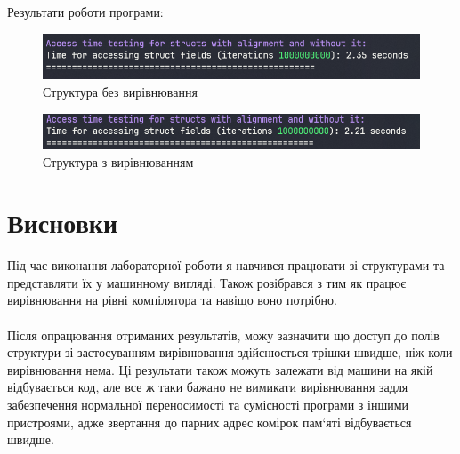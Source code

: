 Результати роботи програми:

\begin{figure}[h!]
    \centering
    \includegraphics[width=14cm]{reports/algos/lab4/assets/8.png}
    \caption{Структура без вирівнювання}
\end{figure}

\begin{figure}[h!]
    \centering
    \includegraphics[width=14cm]{reports/algos/lab4/assets/9.png}
    \caption{Структура з вирівнюванням}
\end{figure}


\clearpage
\section{Висновки}
Під час виконання лабораторної роботи я навчився працювати зі структурами та представляти їх у машинному вигляді. Також розібрався з тим як працює вирівнювання на рівні компілятора та навіщо воно потрібно.
\\ 
\\
Після опрацювання отриманих результатів, можу зазначити що доступ до полів структури зі застосуванням вирівнювання здійснюється трішки швидше, ніж коли вирівнювання нема. Ці результати також можуть залежати від машини на якій відбувається код, але все ж таки бажано не вимикати вирівнювання задля забезпечення нормальної переносимості та сумісності програми з іншими пристроями, адже звертання до парних адрес комірок пам`яті відбувається швидше.

